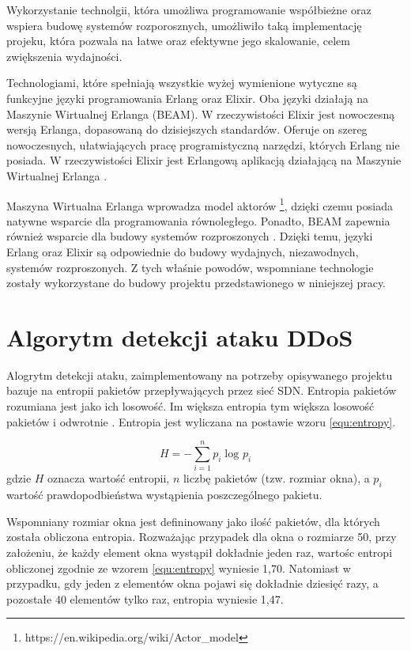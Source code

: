 Wykorzystanie technolgii, która umożliwa programowanie współbieżne oraz wspiera
budowę systemów rozporosznych, umożliwiło taką implementację projeku, która
pozwala na łatwe oraz efektywne jego skalowanie, celem zwiększenia wydajności.

Technologiami, które spełniają wszystkie wyżej wymienione wytyczne są funkcyjne
języki programowania Erlang oraz Elixir. Oba języki działają na Maszynie
Wirtualnej Erlanga (BEAM). W rzeczywistości Elixir jest nowoczesną wersją
Erlanga, dopasowaną do dzisiejszych standardów. Oferuje on szereg nowoczesnych,
ułatwiających pracę programistyczną narzędzi, których Erlang nie posiada. W
rzeczywistości Elixir jest Erlangową aplikacją działającą na Maszynie Wirtualnej
Erlanga \cite{thebeambook}.

Maszyna Wirtualna Erlanga wprowadza model aktorów
\footnote{https://en.wikipedia.org/wiki/Actor\_model}, dzięki czemu posiada
natywne wsparcie dla programowania równoległego. Ponadto, BEAM zapewnia
również wsparcie dla budowy systemów rozproszonych \cite{lyserlang}. Dzięki
temu, języki Erlang oraz Elixir są odpowiednie do budowy wydajnych,
niezawodnych, systemów rozproszonych. Z tych właśnie powodów, wspomniane
technologie zostały wykorzystane do budowy projektu przedstawionego w niniejszej
pracy.

\section{Algorytm detekcji ataku DDoS}

Alogrytm detekcji ataku, zaimplementowany na potrzeby opisywanego projektu
bazuje na entropii pakietów przepływających przez sieć SDN. Entropia pakietów
rozumiana jest jako ich losowość. Im większa entropia tym większa losowość
pakietów i odwrotnie \cite{mainddosarticle}. Entropia jest wyliczana na postawie
wzoru \ref{equ:entropy}.

\begin{equation}
H = -\sum_{i=1}^{n}p_{i}\log_{}p_{i}
\label{equ:entropy}
\end{equation}
gdzie $H$ oznacza wartość entropii, $n$ liczbę pakietów (tzw. rozmiar okna),
a $p_{i}$ wartość prawdopodbieństwa wystąpienia poszczególnego pakietu.

Wspomniany rozmiar okna jest defininowany jako ilość pakietów, dla których
została obliczona entropia. Rozważając przypadek dla okna o rozmiarze 50, przy
założeniu, że każdy element okna wystąpił dokładnie jeden raz, wartośc entropi
obliczonej zgodnie ze wzorem \ref{equ:entropy} wyniesie 1,70. Natomiast w
przypadku, gdy jeden z elementów okna pojawi się dokładnie dziesięć razy, a
pozostałe 40 elementów tylko raz, entropia wyniesie 1,47.

